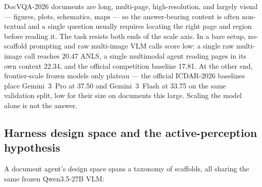 DocVQA-2026 documents are long, multi-page, high-resolution, and largely visual --- figures, plots, schematics, maps --- so the answer-bearing content is often non-textual and a single question usually requires locating the right page and region before reading it. The task resists both ends of the scale axis. In a bare setup, no-scaffold prompting and raw multi-image VLM calls score low: a single raw multi-image call reaches 20.47 ANLS, a single multimodal agent reading pages in its own context 22.34, and the official competition baseline 17.81. At the other end, frontier-scale frozen models only plateau --- the official ICDAR-2026 baselines place Gemini~3~Pro at 37.50 and Gemini~3~Flash at 33.75 on the same validation split, low for their size on documents this large. Scaling the model alone is not the answer.

\subsection{Harness design space and the active-perception hypothesis}

A document agent's design space spans a taxonomy of scaffolds, all sharing the same frozen Qwen3.5-27B VLM:

